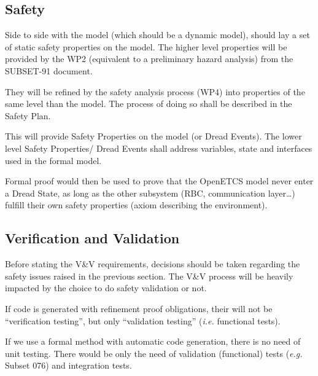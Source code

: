 \documentclass{template/openetcs_article}
\begin{document}
\subsection{Safety}
\label{safety}
\begin{justif}
Side to side with the model (which should be a dynamic model), should lay a set of  
static safety properties on the model. The higher level properties will be provided 
by the WP2 (equivalent to a preliminary hazard analysis) from the SUBSET-91 document.

They will be refined by the safety analysis process (WP4) into properties of the same 
level than the model. The process of doing so shall be described in the Safety Plan.

This will provide Safety Properties on the model (or Dread Events). The lower level Safety Properties/
Dread Events shall address variables, state and interfaces used in the formal model.

Formal proof would then be used to prove that the OpenETCS model never enter a Dread State, 
as long as the other subsystem (RBC, communication layer\dots) fulfill their own safety properties
(axiom describing the environment).
\end{justif}


\tbc


\subsection{Verification and Validation}



\begin{issue}Before stating the V\&V requirements, decisions should be taken regarding 
the safety issues raised in the previous section. The V\&V process will be heavily impacted
by the choice to do safety validation or not. 

If code is generated with refinement proof obligations, 
their will not be “verification testing”, but only “validation testing” 
(\emph{i.e.} functional tests).

If we use a formal method with automatic code generation, there is no need of unit testing. 
There would be only the need of validation (functional) tests (\emph{e.g.} Subset 076) and 
integration tests.

\\



\end{issue}
\end{document}
